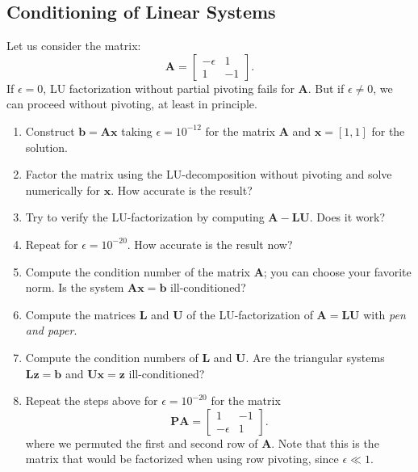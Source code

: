 \subsection{Conditioning of Linear Systems}
\begin{exercise}
    Let us consider the matrix:
    \[
        \mathbf{A} =
        \begin{bmatrix}
            -\epsilon & 1 \\ 
            1 & -1
        \end{bmatrix}.
    \]
    If $\epsilon=0$, LU factorization without partial pivoting fails for $\mathbf{A}$. But if $\epsilon\neq 0$, we can proceed without pivoting, at least in principle.

    \begin{enumerate}[label=(\alph*)]
        \item Construct $\mathbf{b}=\mathbf{Ax}$ taking $\epsilon=10^{-12}$ for the matrix $\mathbf{A}$ and $\mathbf{x}=[1,1]$ for the solution.

        \item Factor the matrix using the LU-decomposition without pivoting and solve numerically for $\mathbf{x}$. How accurate is the result?

        \item Try to verify the LU-factorization by computing $\mathbf{A}-\mathbf{LU}$. Does it work?

        \item Repeat for $\epsilon=10^{-20}$. How accurate is the result now?

        \item Compute the condition number of the matrix $\mathbf{A}$; you can choose your favorite norm. Is the system $\mathbf{Ax}=\mathbf{b}$ ill-conditioned?

        \item Compute the matrices $\mathbf{L}$ and $\mathbf{U}$ of the LU-factorization of $\mathbf{A}=\mathbf{LU}$ with \emph{pen and paper}.

        \item Compute the condition numbers of $\mathbf{L}$ and $\mathbf{U}$. Are the triangular systems $\mathbf{L}\mathbf{z}=\mathbf{b}$ and $\mathbf{U}\mathbf{x}=\mathbf{z}$ ill-conditioned?

        \item Repeat the steps above for $\epsilon=10^{-20}$ for the matrix
        \[
            \mathbf{PA}=
                \begin{bmatrix}
                1 & -1 \\
                -\epsilon & 1 
            \end{bmatrix}.
        \]
        where we permuted the first and second row of $\mathbf{A}$. Note that this is the matrix that would be factorized when using row pivoting, since $\epsilon\ll1$.
    \end{enumerate}
\end{exercise}

